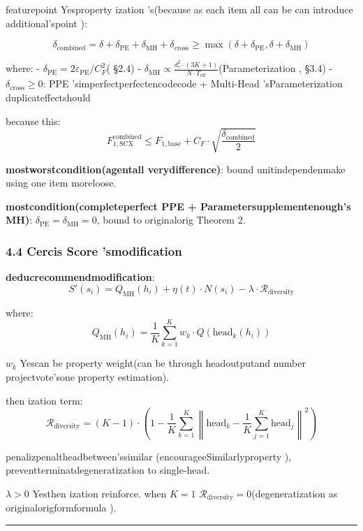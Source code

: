 \documentclass[
  12pt,
]{article}
\begin{document}
featurepoint Yesproperty ization 's(because as each item all can be can introduce additional'spoint ):

\[\boxed{\delta_{\text{combined}} = \delta + \delta_{\text{PE}} + \delta_{\text{MH}} + \delta_{\text{cross}} \geq \max(\delta + \delta_{\text{PE}}, \delta + \delta_{\text{MH}})}\]

where:  - \(\delta_{\text{PE}} = 2\varepsilon_{\text{PE}} / C_F^2\)(
§2.4) -
\(\delta_{\text{MH}} \propto \frac{d_s^2 \cdot (3K + 1)}{N \cdot T_{\text{eff}}}\)(Parameterization , §3.4)
- \(\delta_{\text{cross}} \geq 0\): PPE 'simperfectperfectencodecode  + Multi-Head
'sParameterization duplicateffectshould 

because this: 
\[F_{1,\text{SCX}}^{\text{combined}} \leq F_{1,\text{base}} + C_F \cdot \sqrt{\frac{\delta_{\text{combined}}}{2}}\]

\textbf{mostworstcondition(agentall verydifference)}: bound unitindependenmake using one item moreloose. 

\textbf{mostcondition(completeperfect PPE + Parametersupplementenough's
MH)}: \(\delta_{\text{PE}} = \delta_{\text{MH}} = 0\), bound to originalorig
Theorem 2. 

\subsubsection{4.4 Cercis Score
'smodification}\label{cercis-score-ux7684ux4feeux6539}

\textbf{deducrecommendmodification}: 
\[\boxed{S'(s_i) = Q_{\text{MH}}(h_i) + \eta(t) \cdot N(s_i) - \lambda \cdot \mathcal{R}_{\text{diversity}}}\]

where: 
\[Q_{\text{MH}}(h_i) = \frac{1}{K} \sum_{k=1}^{K} w_k \cdot Q(\text{head}_k(h_i))\]

\(w_k\) Yescan be property weight(can be through headoutputand number projectvote'sone property estimation). 

 then ization term: 
\[\mathcal{R}_{\text{diversity}} = (K - 1) \cdot \left(1 - \frac{1}{K} \sum_{k=1}^{K} \left\|\text{head}_k - \frac{1}{K}\sum_{j=1}^{K} \text{head}_j\right\|^2\right)\]

penalizpenaltheadbetween'ssimilar (encourageeSimilarlyproperty ), preventterminatdegeneratization to single-head. 

\(\lambda > 0\) Yesthen ization reinforce. when  \(K = 1\) 
\(\mathcal{R}_{\text{diversity}} = 0\)(degeneratization as originalorigformformula ). 

\begin{center}\rule{0.5\linewidth}{0.5pt}\end{center}
\end{document}

